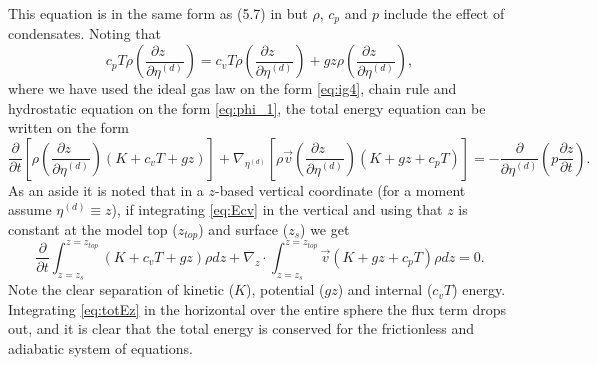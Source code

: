 \documentclass{agujournal}
\begin{document}
{This equation is in the same form as (5.7) in \cite{K1974MWR} but $\rho$, $c_p$ and $p$ include the effect of condensates. Noting that
\begin{equation}
c_pT\rho \left( \frac{\partial z\quad }{\partial \eta^{(d)}}\right)=c_vT\rho \left( \frac{\partial z\quad }{\partial \eta^{(d)}}\right)+g z \rho \left( \frac{\partial z\quad }{\partial \eta^{(d)}}\right),
\end{equation}
where we have used the ideal gas law on the form \eqref{eq:ig4}, chain rule and hydrostatic equation on the form \eqref{eq:phi_1}, the total energy equation can be written on the form
\begin{equation}
\frac{\partial }{\partial t}\left[ \rho \left( \frac{\partial z\quad }{\partial \eta^{(d)}}\right)\left(K+c_vT+gz\right)\right]+\nabla_{\eta^{(d)}} \left[ \rho \vec{v} \left( \frac{\partial z\quad }{\partial \eta^{(d)}}\right) \left( K+gz+c_pT \right) \right]=-\frac{\partial}{\partial \eta^{(d)}}\left( p\frac{\partial z}{\partial t}\right).\label{eq:Ecv}
\end{equation}
As an aside it is noted that in a $z$-based vertical coordinate (for a moment assume $\eta^{(d)}\equiv z$), if integrating \eqref{eq:Ecv} in the vertical and using that $z$ is constant at the model top ($z_{top}$) and surface ($z_s$) we get
\begin{equation}
\frac{\partial }{\partial t}\int_{z=z_s}^{z=z_{top}}\left(K+c_vT+gz\right)\rho dz+\nabla_z \cdot \int_{z=z_s}^{z=z_{top}} \vec{v} \left( K+gz+c_pT \right) \rho dz=0.\label{eq:totEz}
\end{equation}
Note the clear separation of kinetic ($K$), potential ($gz$) and internal ($c_vT$) energy. Integrating \eqref{eq:totEz} in the horizontal over the entire sphere the flux term drops out, and it is clear that the total energy is conserved for the frictionless and adiabatic system of equations.

}
\end{document}
